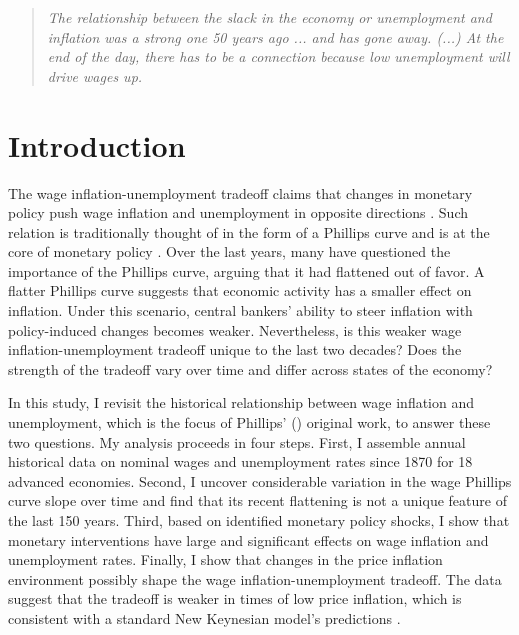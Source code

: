 \documentclass[12pt]{article}
\begin{document}
\clearpage

\begin{quote}
\textit{The relationship between the slack in the economy or unemployment and inflation was a strong one 50 years ago ... and has gone away. (...) At the end of the day, there has to be a connection because low unemployment will drive wages up.} \cite{Powell2019}
\end{quote}


\section{Introduction}
The wage inflation-unemployment tradeoff claims that changes in monetary policy push wage inflation and unemployment in opposite directions \citep{Mankiw2001}. Such relation is traditionally thought of in the form of a Phillips curve and is at the core of monetary policy \citep{Barnichon2019, Eser2020}. Over the last years, many have questioned the importance of the Phillips curve, arguing that it had flattened out of favor. A flatter Phillips curve suggests that economic activity has a smaller effect on inflation. Under this scenario, central bankers' ability to steer inflation with policy-induced changes becomes weaker. Nevertheless, is this weaker wage inflation-unemployment tradeoff unique to the last two decades? Does the strength of the tradeoff vary over time and differ across states of the economy?


In this study, I revisit the historical relationship between wage inflation and unemployment, which is the focus of Phillips' (\citeyear{Phillips1958}) original work, to answer these two questions. My analysis proceeds in four steps. First, I assemble annual historical data on nominal wages and unemployment rates since 1870 for 18 advanced economies. Second, I uncover considerable variation in the wage Phillips curve slope over time and find that its recent flattening is not a unique feature of the last 150 years. Third, based on identified monetary policy shocks, I show that monetary interventions have large and significant effects on wage inflation and unemployment rates. Finally, I show that changes in the price inflation environment possibly shape the wage inflation-unemployment tradeoff. The data suggest that the tradeoff is weaker in times of low price inflation, which is consistent with a standard New Keynesian model's predictions \citep{Benati2007}.
\end{document}
